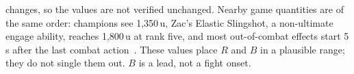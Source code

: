 changes, so the values are not verified unchanged.
Nearby game quantities are of the same order: champions see 1,350\,u, Zac's Elastic Slingshot, a
non-ultimate engage ability, reaches 1,800\,u at rank five, and most out-of-combat effects start 5\,s
after the last combat action~\cite{lolwiki2026sight,lolwiki2026zac,lolwiki2026combatstatus}. These
values place $R$ and $B$ in a plausible range; they do not single them out. $B$ is a lead, not a fight
onset.

